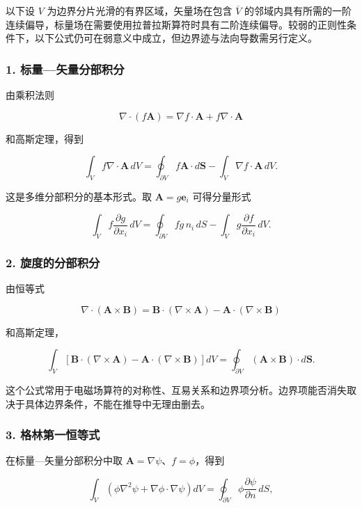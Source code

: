 以下设 \(V\) 为边界分片光滑的有界区域，矢量场在包含 \(\overline V\)
的邻域内具有所需的一阶连续偏导，标量场在需要使用拉普拉斯算符时具有二阶连续偏导。较弱的正则性条件下，以下公式仍可在弱意义中成立，但边界迹与法向导数需另行定义。

\subsubsection{1.
标量---矢量分部积分}\label{m1:ux6807ux91cfux77e2ux91cfux5206ux90e8ux79efux5206}

由乘积法则

\[
\nabla\cdot(f\mathbf A)
=
\nabla f\cdot\mathbf A
+
f\nabla\cdot\mathbf A
\]

和高斯定理，得到

\[
\boxed{
\int_V f\nabla\cdot\mathbf A\,dV
=
\oint_{\partial V}f\mathbf A\cdot d\mathbf S
-
\int_V\nabla f\cdot\mathbf A\,dV
}.
\]

这是多维分部积分的基本形式。取 \(\mathbf A=g\mathbf e_i\) 可得分量形式

\[
\boxed{
\int_V f\frac{\partial g}{\partial x_i}\,dV
=
\oint_{\partial V}fg\,n_i\,dS
-
\int_Vg\frac{\partial f}{\partial x_i}\,dV
}.
\]

\subsubsection{2.
旋度的分部积分}\label{m1:ux65cbux5ea6ux7684ux5206ux90e8ux79efux5206}

由恒等式

\[
\nabla\cdot(\mathbf A\times\mathbf B)
=
\mathbf B\cdot(\nabla\times\mathbf A)
-
\mathbf A\cdot(\nabla\times\mathbf B)
\]

和高斯定理，

\[
\boxed{
\int_V
\left[
\mathbf B\cdot(\nabla\times\mathbf A)
-
\mathbf A\cdot(\nabla\times\mathbf B)
\right]dV
=
\oint_{\partial V}
(\mathbf A\times\mathbf B)\cdot d\mathbf S
}.
\]

这个公式常用于电磁场算符的对称性、互易关系和边界项分析。边界项能否消失取决于具体边界条件，不能在推导中无理由删去。

\subsubsection{3.
格林第一恒等式}\label{m1:ux683cux6797ux7b2cux4e00ux6052ux7b49ux5f0f}

在标量---矢量分部积分中取 \(\mathbf A=\nabla\psi\)、\(f=\phi\)，得到

\[
\boxed{
\int_V
\left(
\phi\nabla^2\psi
+
\nabla\phi\cdot\nabla\psi
\right)dV
=
\oint_{\partial V}
\phi\frac{\partial\psi}{\partial n}\,dS
},
\]

